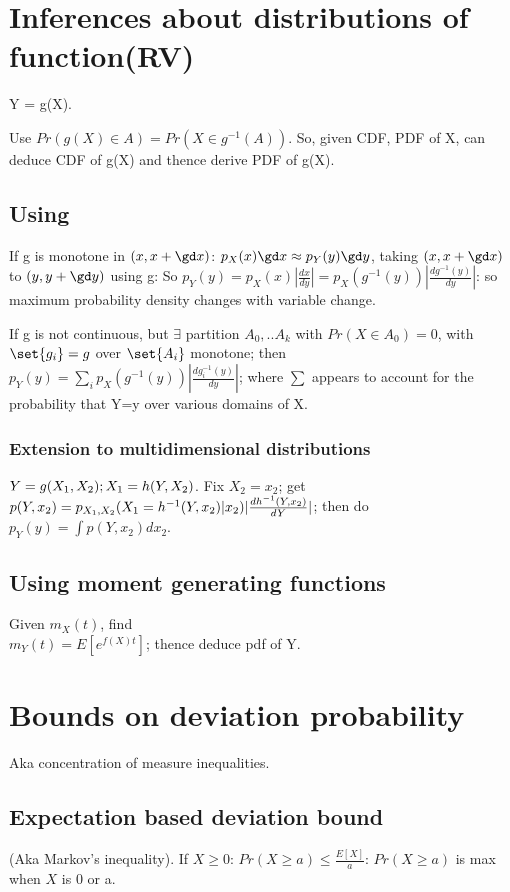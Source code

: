 \documentclass[oneside, article]{memoir}
\begin{document}
\chapter{Inferences about distributions of function(RV)}
Y = g(X).

Use $Pr(g(X) \in A) = Pr(X \in g^{-1}(A))$. So, given CDF, PDF of X, can deduce CDF of g(X) and thence derive PDF of g(X).

\section{Using }
If g is monotone in $(x, x+\gd x)$: $p_{X}(x)\gd x \approx p_{Y}(y)\gd y$, taking $(x, x+\gd x)$ to $(y, y+\gd y)$ using g: So $p_Y(y) = p_{X}(x)|\frac{dx}{dy}| = p_{X}(g^{-1}(y))|\frac{d g^{-1}(y)}{dy}| $: so maximum probability density changes with variable change.

If g is not continuous, but $\exists$ partition $A_{0}, .. A_{k}$ with $Pr(X \in A_{0}) = 0$, with $\set{g_{i}} = g $ over $\set{A_{i}}$ monotone; then $p_Y(y) = \sum_{i} p_{X}(g^{-1}(y))|\frac{d g_{i}^{-1}(y)}{dy}|$; where $\sum$ appears to account for the probability that Y=y over various domains of X.

\subsection{Extension to multidimensional distributions}
$Y = g(X_{1}, X_{2}); \\
X_{1} = h(Y, X_{2})$. Fix $X_{2} = x_{2}$; get $p(Y, x_{2}) = p_{X_{1}, X_{2}}(X_{1} \\
= h^{-1}(Y, x_{2})| x_{2})|\frac{dh^{-1}(Y, x_{2})}{d Y}|$; then do $p_{Y}(y) = \int p(Y, x_{2}) dx_{2}$.

\section{Using moment generating functions}
Given $m_{X}(t)$, find \\
$m_{Y}(t) = E[e^{f(X)t}]$; thence deduce pdf of Y.


\chapter{Bounds on deviation probability}
Aka concentration of measure inequalities.

\section{Expectation based deviation bound}
(Aka Markov's inequality). If $X\geq 0$: $Pr(X \geq a) \leq \frac{E[X]}{a}$: $Pr(X \geq a)$ is max when $X$ is 0 or a.
\end{document}
